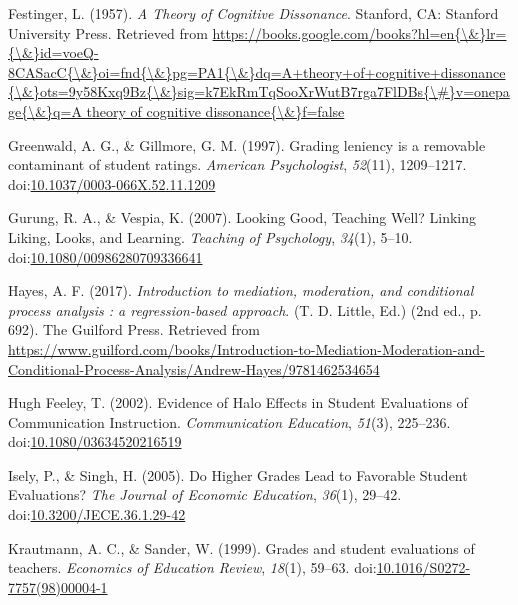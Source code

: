 \documentclass[man]{apa6}
\theoremstyle{definition}
\theoremstyle{definition}
\theoremstyle{definition}
\theoremstyle{remark}
\begin{document}
\hypertarget{ref-Festinger1957}{}
Festinger, L. (1957). \emph{A Theory of Cognitive Dissonance}. Stanford,
CA: Stanford University Press. Retrieved from
\href{https://books.google.com/books?hl=en\%7B/\&\%7Dlr=\%7B/\&\%7Did=voeQ-8CASacC\%7B/\&\%7Doi=fnd\%7B/\&\%7Dpg=PA1\%7B/\&\%7Ddq=A+theory+of+cognitive+dissonance\%7B/\&\%7Dots=9y58Kxq9Bz\%7B/\&\%7Dsig=k7EkRmTqSooXrWutB7rga7FlDBs\%7B/\#\%7Dv=onepage\%7B/\&\%7Dq=A\%20theory\%20of\%20cognitive\%20dissonance\%7B/\&\%7Df=false}{https://books.google.com/books?hl=en\{\textbackslash{}\&\}lr=\{\textbackslash{}\&\}id=voeQ-8CASacC\{\textbackslash{}\&\}oi=fnd\{\textbackslash{}\&\}pg=PA1\{\textbackslash{}\&\}dq=A+theory+of+cognitive+dissonance\{\textbackslash{}\&\}ots=9y58Kxq9Bz\{\textbackslash{}\&\}sig=k7EkRmTqSooXrWutB7rga7FlDBs\{\textbackslash{}\#\}v=onepage\{\textbackslash{}\&\}q=A theory of cognitive dissonance\{\textbackslash{}\&\}f=false}

\hypertarget{ref-Greenwald1997}{}
Greenwald, A. G., \& Gillmore, G. M. (1997). Grading leniency is a
removable contaminant of student ratings. \emph{American Psychologist},
\emph{52}(11), 1209--1217.
doi:\href{https://doi.org/10.1037/0003-066X.52.11.1209}{10.1037/0003-066X.52.11.1209}

\hypertarget{ref-Gurung2007}{}
Gurung, R. A., \& Vespia, K. (2007). Looking Good, Teaching Well?
Linking Liking, Looks, and Learning. \emph{Teaching of Psychology},
\emph{34}(1), 5--10.
doi:\href{https://doi.org/10.1080/00986280709336641}{10.1080/00986280709336641}

\hypertarget{ref-Hayes2017}{}
Hayes, A. F. (2017). \emph{Introduction to mediation, moderation, and
conditional process analysis : a regression-based approach}. (T. D.
Little, Ed.) (2nd ed., p. 692). The Guilford Press. Retrieved from
\url{https://www.guilford.com/books/Introduction-to-Mediation-Moderation-and-Conditional-Process-Analysis/Andrew-Hayes/9781462534654}

\hypertarget{ref-HughFeeley2002}{}
Hugh Feeley, T. (2002). Evidence of Halo Effects in Student Evaluations
of Communication Instruction. \emph{Communication Education},
\emph{51}(3), 225--236.
doi:\href{https://doi.org/10.1080/03634520216519}{10.1080/03634520216519}

\hypertarget{ref-Isely2005}{}
Isely, P., \& Singh, H. (2005). Do Higher Grades Lead to Favorable
Student Evaluations? \emph{The Journal of Economic Education},
\emph{36}(1), 29--42.
doi:\href{https://doi.org/10.3200/JECE.36.1.29-42}{10.3200/JECE.36.1.29-42}

\hypertarget{ref-Krautmann1999}{}
Krautmann, A. C., \& Sander, W. (1999). Grades and student evaluations
of teachers. \emph{Economics of Education Review}, \emph{18}(1), 59--63.
doi:\href{https://doi.org/10.1016/S0272-7757(98)00004-1}{10.1016/S0272-7757(98)00004-1}
\end{document}
